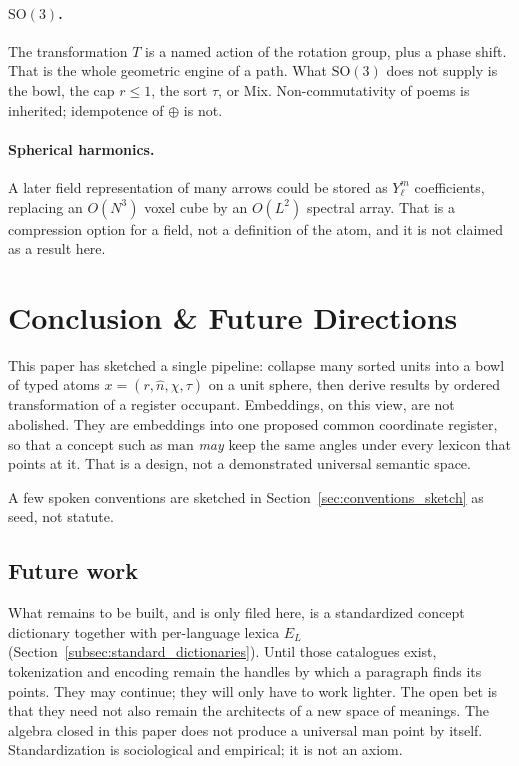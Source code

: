 \documentclass[12pt, a4paper]{article}
\begin{document}
\paragraph{$\mathrm{SO}(3)$.}
The transformation $T$ is a named action of the rotation group, plus a
phase shift. That is the whole geometric engine of a path. What
$\mathrm{SO}(3)$ does not supply is the bowl, the cap $r\le 1$, the
sort $\tau$, or Mix. Non-commutativity of poems is inherited;
idempotence of $\oplus$ is not.

\paragraph{Spherical harmonics.}
A later field representation of many arrows could be stored as
$Y_\ell^m$ coefficients, replacing an $O(N^3)$ voxel cube by an
$O(L^2)$ spectral array. That is a compression option for a field, not
a definition of the atom, and it is not claimed as a result here.

\section{Conclusion \& Future Directions}
\label{sec:conclusion}

This paper has sketched a single pipeline: collapse many sorted units
into a bowl of typed atoms $x=(r,\hat n,\chi,\tau)$ on a unit sphere,
then derive results by ordered transformation of a register occupant.
Embeddings, on this view, are
not abolished. They are embeddings into one proposed common coordinate
register, so that a
concept such as $\mathrm{man}$ \emph{may} keep the same angles under every
lexicon that points at it. That is a design, not a demonstrated
universal semantic space.

A few spoken conventions are sketched in
Section~\ref{sec:conventions_sketch} as seed, not statute.

\subsection{Future work}
\label{subsec:future_work}
What remains to be built, and is only filed here, is a standardized
concept dictionary together with per-language lexica $E_L$
(Section~\ref{subsec:standard_dictionaries}). Until those catalogues
exist, tokenization and encoding remain the handles by which a
paragraph finds its points. They may continue; they will only have to
work lighter. The open bet is that they need not also
remain the architects of a new space of meanings.
The algebra closed in this paper does not produce a universal
$\mathrm{man}$ point by itself. Standardization is sociological and
empirical; it is not an axiom.
\end{document}
